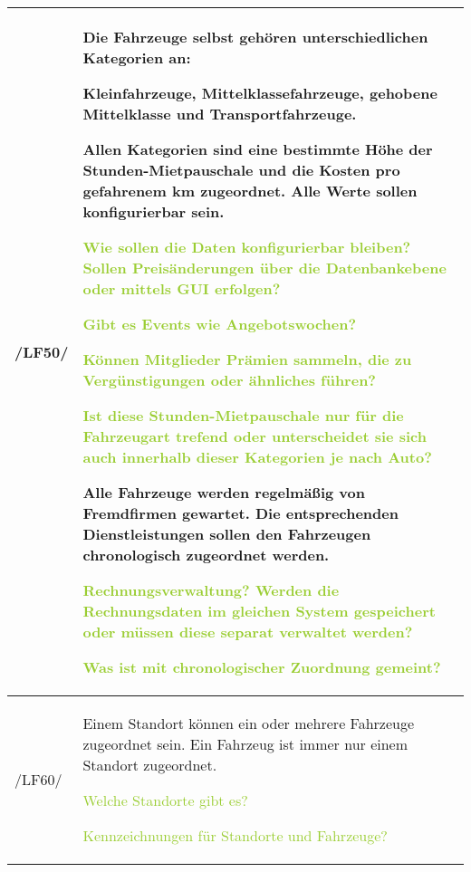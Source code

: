 \begin{tabular}[ht] {l | p{13cm}}
    \hline
    /LF50/ & Die Fahrzeuge selbst gehören unterschiedlichen Kategorien an: 

    Kleinfahrzeuge, Mittelklassefahrzeuge, gehobene Mittelklasse und Transportfahrzeuge.  

    Allen Kategorien sind eine bestimmte Höhe der Stunden-Mietpauschale und die Kosten pro gefahrenem km zugeordnet. Alle Werte sollen konfigurierbar sein. 

    \textcolor{YellowGreen}{Wie sollen die Daten konfigurierbar bleiben? Sollen Preisänderungen über die Datenbankebene oder mittels GUI erfolgen?}

    \textcolor{NavyBlue}{}

    \textcolor{YellowGreen}{Gibt es Events wie Angebotswochen?}

    \textcolor{NavyBlue}{}

    \textcolor{YellowGreen}{Können Mitglieder Prämien sammeln, die zu Vergünstigungen oder ähnliches führen?}

    \textcolor{NavyBlue}{}

    \textcolor{YellowGreen}{Ist diese Stunden-Mietpauschale nur für die Fahrzeugart trefend oder unterscheidet sie sich auch innerhalb dieser Kategorien je nach Auto?}

    \textcolor{NavyBlue}{}

    Alle Fahrzeuge werden regelmäßig von Fremdfirmen gewartet. Die entsprechenden Dienstleistungen sollen den Fahrzeugen chronologisch zugeordnet werden. 
    
    \textcolor{YellowGreen}{Rechnungsverwaltung? Werden die Rechnungsdaten im gleichen System gespeichert oder müssen diese separat verwaltet werden?}

    \textcolor{NavyBlue}{}

    \textcolor{YellowGreen}{Was ist mit chronologischer Zuordnung gemeint?}

    \textcolor{NavyBlue}{}
    \\
    \hline
    /LF60/ & Einem Standort können ein oder mehrere Fahrzeuge zugeordnet sein. Ein Fahrzeug ist immer nur einem Standort zugeordnet. 
    
    \textcolor{YellowGreen}{Welche Standorte gibt es?}

    \textcolor{NavyBlue}{}

    \textcolor{YellowGreen}{Kennzeichnungen für Standorte und Fahrzeuge?}

    \textcolor{NavyBlue}{}
    

\end{tabular}
